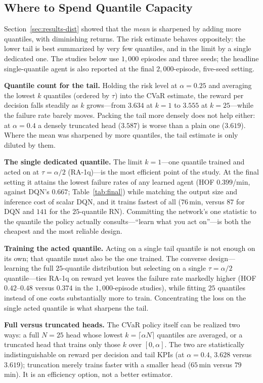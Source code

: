 \documentclass[conference]{IEEEtran}
\begin{document}
\subsection{Where to Spend Quantile Capacity}
\label{sec:results-bridge}
Section~\ref{sec:results-dist} showed that the \emph{mean} is sharpened by adding
more quantiles, with diminishing returns. The risk estimate behaves oppositely: the lower
tail is best summarized by very few quantiles, and in the limit by a single
dedicated one. The studies below use $1{,}000$ episodes and three seeds; the
headline single-quantile agent is also reported at the final
$2{,}000$-episode, five-seed setting.

\textbf{Quantile count for the tail.} Holding the risk level at $\alpha=0.25$ and
averaging the lowest $k$ quantiles (ordered by $\tau$) into the CVaR estimate, the reward per decision
falls steadily as $k$ grows---from $3.634$ at $k=1$ to $3.555$ at $k=25$---while
the failure rate barely moves. Packing the tail more densely does not help either:
at $\alpha=0.4$ a densely truncated head ($3.587$) is worse than a plain one
($3.619$). Where the mean was sharpened by more quantiles, the tail estimate is
only diluted by them.

\textbf{The single dedicated quantile.} The limit $k=1$---one quantile trained and
acted on at $\tau=\alpha/2$ (RA-1q)---is the most efficient point of the study. At
the final setting it attains the lowest failure rates of any learned agent
(HOF $0.399$/min, against DQN's $0.667$; Table~\ref{tab:final}) while matching the
output size and inference cost of scalar DQN, and it trains fastest of all
($76$\,min, versus $87$ for DQN and $141$ for the $25$-quantile RN). Committing the
network's one statistic to the quantile the policy actually consults---``learn what
you act on''---is both the cheapest and the most reliable design.

\textbf{Training the acted quantile.} Acting on a single tail quantile is not
enough on its own; that quantile must also be the one trained. The converse
design---learning the full $25$-quantile distribution but selecting on a single
$\tau=\alpha/2$ quantile---ties RA-1q on reward yet leaves the failure rate
markedly higher (HOF $0.42$--$0.48$ versus $0.374$ in the $1{,}000$-episode studies), while
fitting $25$ quantiles instead of one costs substantially more to train.
Concentrating the loss on the single acted quantile is what sharpens the tail.

\textbf{Full versus truncated heads.}\label{sec:results-trunc} The CVaR policy
itself can be realized two ways: a full $N=25$ head whose lowest
$k=\lceil\alpha N\rceil$ quantiles are averaged, or a truncated head that trains
only those $k$ over $[0,\alpha]$. The two are statistically indistinguishable on
reward per decision and tail KPIs (at $\alpha=0.4$, $3.628$ versus $3.619$);
truncation merely trains faster with a smaller head ($65$\,min versus $79$\,min). It is
an efficiency option, not a better estimator.
\end{document}
